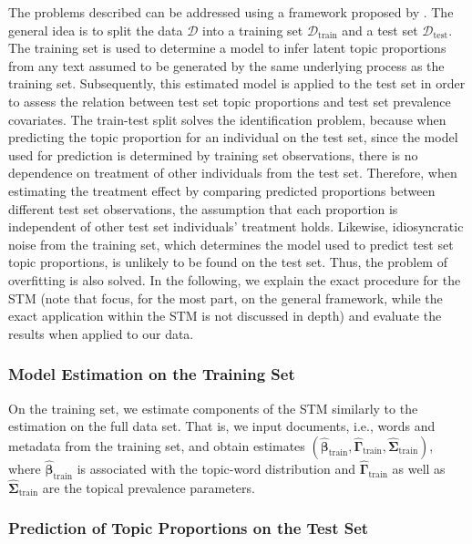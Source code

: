 The problems described can be addressed using a framework proposed by \cite{egami2018make}. The general idea is to split the data $\mathcal{D}$ into a training set $\mathcal{D}_{\text{train}}$ and a test set $\mathcal{D}_{\text{test}}$. The training set is used to determine a model to infer latent topic proportions from any text assumed to be generated by the same underlying process as the training set. Subsequently, this estimated model is applied to the test set in order to assess the relation between test set topic proportions and test set prevalence covariates. The train-test split solves the identification problem, because when predicting the topic proportion for an individual on the test set, since the model used for prediction is determined by training set observations, there is no dependence on treatment of other individuals from the test set. Therefore, when estimating the treatment effect by comparing predicted proportions between different test set observations, the assumption that each proportion is independent of other test set individuals' treatment holds. Likewise, idiosyncratic noise from the training set, which determines the model used to predict test set topic proportions, is unlikely to be found on the test set. Thus, the problem of overfitting is also solved. In the following, we explain the exact procedure for the STM (note that \cite{egami2018make} focus, for the most part, on the general framework, while the exact application within the STM is not discussed in depth) and evaluate the results when applied to our data.

\subsubsection{Model Estimation on the Training Set}
\label{Model Estimation on the Training Set}

On the training set, we estimate components of the STM similarly to the estimation on the full data set. That is, we input documents, i.e., words and metadata from the training set, and obtain estimates $(\hat{\boldsymbol{\beta}}_{\text{train}}, \hat{\boldsymbol{\Gamma}}_{\text{train}}, \hat{\boldsymbol{\Sigma}}_{\text{train}})$, where $\hat{\boldsymbol{\beta}}_{\text{train}}$ is associated with the topic-word distribution and $\hat{\boldsymbol{\Gamma}}_{\text{train}}$ as well as $\hat{\boldsymbol{\Sigma}}_{\text{train}}$ are the topical prevalence parameters. 

\subsubsection{Prediction of Topic Proportions on the Test Set}
\label{Prediction of Topic Proportions on the Test Set}

